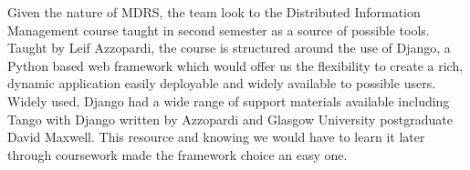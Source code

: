 \documentclass{l3proj}
\begin{document}


Given the nature of MDRS, the team look to the
Distributed Information Management course taught in second semester as a source
of possible tools. Taught by Leif Azzopardi, the course is structured around the
use of Django, a Python based web framework which would offer us the flexibility
to create a rich, dynamic application easily deployable and widely available to
possible users. Widely used, Django had a wide range of support materials
available including Tango with Django written by Azzopardi and Glasgow
University postgraduate David Maxwell. This resource and knowing we would have
to learn it later through coursework made the framework choice an easy one.
\end{document}
